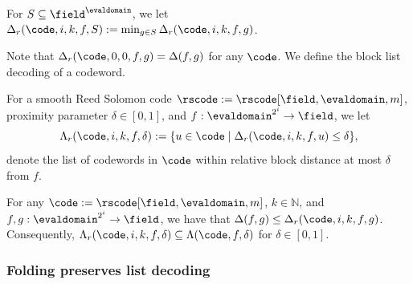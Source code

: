 \begin{definition}\label{def:min_block_rel_distance}
    For $S \subseteq \field^{\evaldomain}$, we let $\Delta_{r}(\code, i, k, f, S) := \min_{g \in S} \Delta_{r}(\code, i, k, f, g)$.
\end{definition}

{Note that $\Delta_{r}(\code, 0, 0, f, g) = \Delta(f, g)$ for any $\code$. We define the block list decoding of a codeword.}

\begin{definition}\label{def:list_close_codewords_block}
    For a smooth Reed Solomon code $\rscode := \rscode[\field, \evaldomain, m]$, proximity parameter $\delta \in [0,1]$, and $f : \evaldomain^{2^i} \to \field$, we let
    \[
    \Lambda_{r}(\code, i, k, f, \delta) := \{ u \in \code \mid \Delta_{r}(\code, i, k, f, u) \leq \delta \},
    \]
    denote the list of codewords in $\code$ within relative block distance at most $\delta$ from $f$.
\end{definition}

\begin{lemma}\label{lemma:block_rel_distance}
    For any $\code := \rscode[\field, \evaldomain, m]$, $k \in \mathbb{N}$, and $f, g : \evaldomain^{2^i} \to \field$, we have that $\Delta(f, g) \leq \Delta_{r}(\code, i, k, f, g)$. Consequently, $\Lambda_{r}(\code, i, k, f, \delta) \subseteq \Lambda(\code, f, \delta)$ for $\delta\in[0,1]$.
\end{lemma}

\subsubsection{Folding preserves list decoding}

